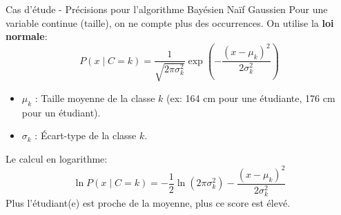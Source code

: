 \begin{frame}{Cas d'étude - Précisions pour l'algorithme Bayésien Naïf Gaussien}
	Pour une variable continue (taille), on ne compte plus des occurrences. On utilise la \textbf{loi normale}:
	\begin{equation}
		P(x \mid C=k) = \frac{1}{\sqrt{2\pi\sigma_k^2}} \exp\left(-\frac{(x-\mu_k)^2}{2\sigma_k^2}\right)
		\nonumber
	\end{equation}
	\pause
	\begin{itemize}
		\item $\mu_k$ : Taille moyenne de la classe $k$ (ex: 164 cm pour une étudiante, 176 cm pour un étudiant).
		\item $\sigma_k$ : \'Ecart-type de la classe $k$.
	\end{itemize}
	\pause
	\vspace{0.3cm}
	Le calcul en logarithme:
	\begin{equation}
		\ln P(x \mid C=k) = -\frac{1}{2} \ln(2\pi\sigma_k^2) - \frac{(x-\mu_k)^2}{2\sigma_k^2}
		\nonumber
	\end{equation}
	Plus l'étudiant(e) est proche de la moyenne, plus ce score est élevé.
\end{frame}
